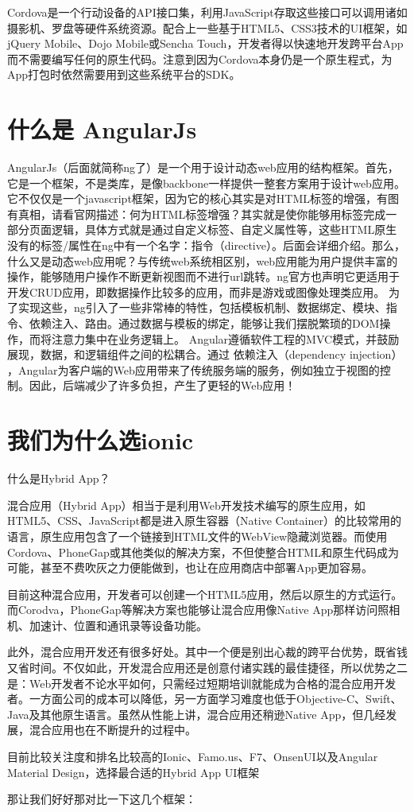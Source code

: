 Cordova是一个行动设备的API接口集，利用JavaScript存取这些接口可以调用诸如摄影机、罗盘等硬件系统资源。配合上一些基于HTML5、CSS3技术的UI框架，如jQuery Mobile、Dojo Mobile或Sencha Touch，开发者得以快速地开发跨平台App而不需要编写任何的原生代码。注意到因为Cordova本身仍是一个原生程式，为App打包时依然需要用到这些系统平台的SDK。

\section{什么是 AngularJs}

AngularJs（后面就简称ng了）是一个用于设计动态web应用的结构框架。首先，它是一个框架，不是类库，是像backbone一样提供一整套方案用于设计web应用。它不仅仅是一个javascript框架，因为它的核心其实是对HTML标签的增强，有图有真相，请看官网描述：何为HTML标签增强？其实就是使你能够用标签完成一部分页面逻辑，具体方式就是通过自定义标签、自定义属性等，这些HTML原生没有的标签/属性在ng中有一个名字：指令（directive）。后面会详细介绍。那么，什么又是动态web应用呢？与传统web系统相区别，web应用能为用户提供丰富的操作，能够随用户操作不断更新视图而不进行url跳转。ng官方也声明它更适用于开发CRUD应用，即数据操作比较多的应用，而非是游戏或图像处理类应用。
为了实现这些，ng引入了一些非常棒的特性，包括模板机制、数据绑定、模块、指令、依赖注入、路由。通过数据与模板的绑定，能够让我们摆脱繁琐的DOM操作，而将注意力集中在业务逻辑上。
Angular遵循软件工程的MVC模式，并鼓励展现，数据，和逻辑组件之间的松耦合。通过 依赖注入（dependency injection） ，Angular为客户端的Web应用带来了传统服务端的服务，例如独立于视图的控制。因此，后端减少了许多负担，产生了更轻的Web应用！

\section{我们为什么选ionic}

什么是Hybrid App？

混合应用（Hybrid App）相当于是利用Web开发技术编写的原生应用，如HTML5、CSS、JavaScript都是进入原生容器（Native Container）的比较常用的语言，原生应用包含了一个链接到HTML文件的WebView隐藏浏览器。而使用Cordova、PhoneGap或其他类似的解决方案，不但使整合HTML和原生代码成为可能，甚至不费吹灰之力便能做到，也让在应用商店中部署App更加容易。

目前这种混合应用，开发者可以创建一个HTML5应用，然后以原生的方式运行。而Corodva，PhoneGap等解决方案也能够让混合应用像Native App那样访问照相机、加速计、位置和通讯录等设备功能。

此外，混合应用开发还有很多好处。其中一个便是别出心裁的跨平台优势，既省钱又省时间。不仅如此，开发混合应用还是创意付诸实践的最佳捷径，所以优势之二是：Web开发者不论水平如何，只需经过短期培训就能成为合格的混合应用开发者。一方面公司的成本可以降低，另一方面学习难度也低于Objective-C、Swift、Java及其他原生语言。虽然从性能上讲，混合应用还稍逊Native App，但几经发展，混合应用也在不断提升的过程中。

目前比较关注度和排名比较高的Ionic、Famo.us、F7、OnsenUI以及Angular Material Design，选择最合适的Hybrid App UI框架

那让我们好好那对比一下这几个框架：